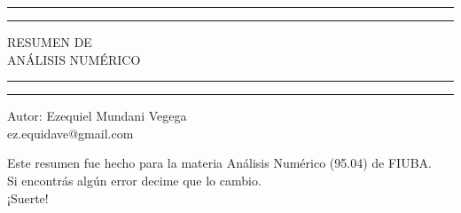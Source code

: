\begin{titlepage}
	\centering %
	\vspace*{1.5\baselineskip} %
	\textcolor{ProbaYellow}{\rule{16cm}{3pt}} %
	\rule{13cm}{1pt} %
	\vspace{0.75\baselineskip} %
	
	{\Huge RESUMEN DE \\
	\vspace{4mm}
	ANÁLISIS NUMÉRICO \\}
	
	\vspace{0.75\baselineskip} %
    \rule{13cm}{1pt}
	\textcolor{ProbaYellow}{\rule{16cm}{3pt}} %
	\vspace{1.75\baselineskip} %
	
	{\large Autor: Ezequiel Mundani Vegega \\
		\vspace*{1.2\baselineskip}
	ez.equidave@gmail.com} \\
	\vfill
	
    Este resumen fue hecho para la materia Análisis Numérico (95.04) de FIUBA. \\ \vspace{1mm}
    Si encontrás algún error decime que lo cambio.\\ \vspace{1mm}
    ¡Suerte!
\end{titlepage}